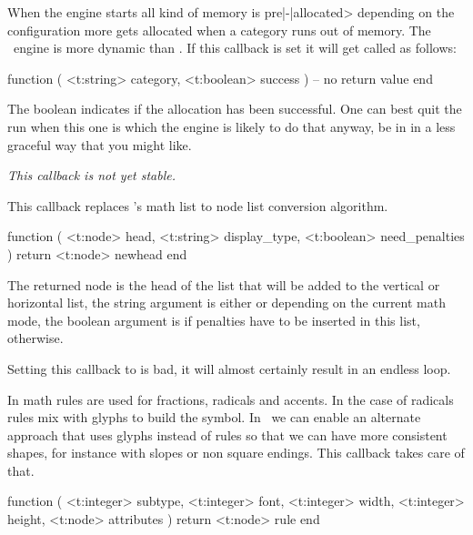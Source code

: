 When the engine starts all kind of memory is pre|-|allocated> depending on the
configuration more gets allocated when a category runs out of memory. The
\LUAMETATEX\ engine is more dynamic than \LUATEX. If this callback is set it will
get called as follows:

\starttyping[option=LUA]
function (
    <t:string>  category,
    <t:boolean> success
)
    -- no return value
end
\stoptyping

The boolean indicates if the allocation has been successful. One can best quit
the run when this one is  which the engine is likely to do that
anyway, be in in a less graceful way that you might like.

\stopsubsection

\startsubsection[title=paragraph_pass]

{\em This callback is not yet stable.}

\stopsubsection

\stopsection

\startsection[title=Math]

\startsubsection[title=mlist_to_hlist]

This callback replaces \LUATEX's math list to node list conversion algorithm.

\starttyping[option=LUA]
function (
    <t:node>    head,
    <t:string>  display_type,
    <t:boolean> need_penalties
)
    return <t:node> newhead
end
\stoptyping

The returned node is the head of the list that will be added to the vertical or
horizontal list, the string argument is either  or 
depending on the current math mode, the boolean argument is  if
penalties have to be inserted in this list,  otherwise.

Setting this callback to  is bad, it will almost certainly result in
an endless loop.

\stopsubsection

\startsubsection[title=math_rule]

In math rules are used for fractions, radicals and accents. In the case of
radicals rules mix with glyphs to build the symbol. In \CONTEXT\ we can enable an
alternate approach that uses glyphs instead of rules so that we can have more
consistent shapes, for instance with slopes or non square endings. This callback
takes care of that.

\starttyping[option=LUA]
function (
    <t:integer> subtype,
    <t:integer> font,
    <t:integer> width,
    <t:integer> height,
    <t:node>    attributes
)
    return <t:node> rule
end
\stoptyping

